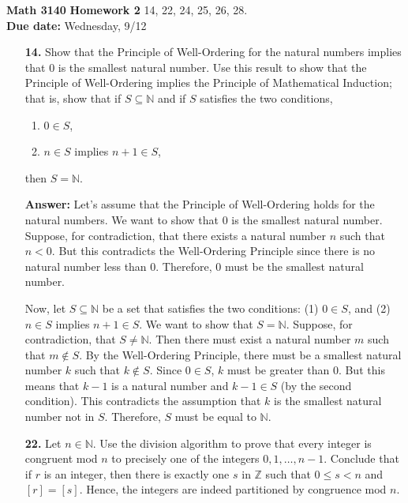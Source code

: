 \documentclass[12pt,reqno]{amsart}
\begin{document}
\thispagestyle{empty}

\noindent \textbf{Math 3140}  \hfill {\bf Homework 2}
\vskip1cm
  14, 22, 24, 25, 26, 28.  \\
{\bf Due date:} Wednesday, 9/12

\medskip

\begin{enumerate}

\item[{\bf 14.}]
Show that the Principle of Well-Ordering for the natural numbers implies that 0 is 
the smallest natural number.  Use this result to show that the Principle of 
Well-Ordering implies the Principle of Mathematical Induction; that is, show 
that if $S \subseteq {\mathbb N}$ and if $S$ satisfies the two conditions,
\begin{enumerate}
  \item $0 \in S$,
  \item $n \in S$ implies $n + 1 \in S$,
\end{enumerate}
then $S = \mathbb N$.  

\textbf{Answer:} Let's assume that the Principle of Well-Ordering holds for the natural numbers. We want to show that 0 is the smallest natural number. Suppose, for contradiction, that there exists a natural number $n$ such that $n < 0$. But this contradicts the Well-Ordering Principle since there is no natural number less than 0. Therefore, 0 must be the smallest natural number.

Now, let $S \subseteq \mathbb{N}$ be a set that satisfies the two conditions: (1) $0 \in S$, and (2) $n \in S$ implies $n + 1 \in S$. We want to show that $S = \mathbb{N}$. Suppose, for contradiction, that $S \neq \mathbb{N}$. Then there must exist a natural number $m$ such that $m \notin S$. By the Well-Ordering Principle, there must be a smallest natural number $k$ such that $k \notin S$. Since $0 \in S$, $k$ must be greater than 0. But this means that $k - 1$ is a natural number and $k - 1 \in S$ (by the second condition). This contradicts the assumption that $k$ is the smallest natural number not in $S$. Therefore, $S$ must be equal to $\mathbb{N}$.

\bigskip

\item[{\bf 22.}]
Let $n \in {\mathbb N}$.  Use the division algorithm to prove that every integer is congruent mod $n$ to precisely one of the integers $0, 1, \ldots, n-1$.  Conclude that if $r$ is an integer, then there is exactly one $s$ in ${\mathbb Z}$ such that $0 \leq s < n$ and $[r] = [s]$.   Hence, the integers are indeed partitioned by congruence mod $n$. 


\end{enumerate}
\end{document}
